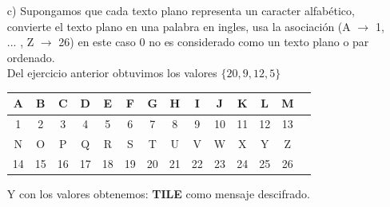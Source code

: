 \documentclass[10pt,a4paper]{article}
\begin{document}
\begin{enumerate}
\begin{itemize}
\begin{itemize}
\end{itemize}
\item[c)] Supongamos que cada texto plano representa un caracter alfabético, convierte el texto plano en una palabra en ingles, usa la asociación (A $\rightarrow$ 1, ... , Z $\rightarrow$ 26) en este caso 0 no es considerado como un texto plano o par ordenado.\\
Del ejercicio anterior obtuvimos los valores $\lbrace 20, 9,12,5 \rbrace$\\
\begin{center}
\begin{tabular}{|c|c|c|c|c|c|c|c|c|c|c|c|c|c|}
\hline
A & B & C & D & E & F & G & H & I & J & K & L & M \\
\hline
1 & 2 & 3 & 4 & 5 & 6 & 7 & 8 & 9 & 10 & 11 & 12 & 13\\
\hline 
N & O & P & Q & R & S & T & U & V & W & X & Y & Z \\
\hline
14 & 15 & 16 & 17 & 18 & 19 & 20 & 21 & 22 & 23 & 24 & 25 & 26\\
\hline 
\end{tabular}
\end{center}
\begin{center}
Y con los valores obtenemos: \textbf{TILE} como mensaje descifrado.
\end{center}
\end{itemize}
\end{enumerate}
\end{document}
